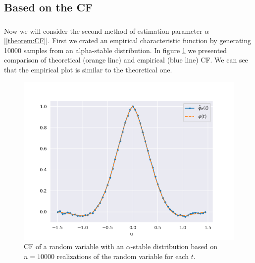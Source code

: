 \documentclass{article}
\begin{document}
		\subsection{Based on the CF}
		\subsubsection{}
        Now we will consider the second method of estimation parameter $\alpha$ [\ref{theorem:CF}]. First we crated an empirical characteristic function by generating 10000 samples from an alpha-stable distribution. In figure \ref{cf1} we presented comparison of theoretical (orange line) and empirical (blue line) CF. We can see that the empirical plot is similar to the theoretical one.		
		\begin{figure}[H]
				\centering
				\includegraphics[width=1\linewidth]{images/stable_CF.png}
			\caption{CF of a random variable with an $\alpha$-stable distribution based on $n=10000$ realizations of the random variable for each $t$.}\label{cf1}
		\end{figure}
\end{document}
